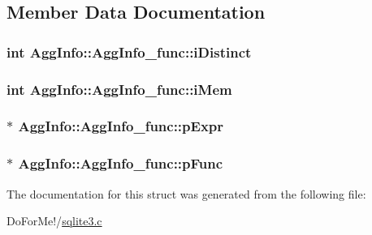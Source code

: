 \subsection{Member Data Documentation}
\hypertarget{struct_agg_info_1_1_agg_info__func_a4a82635b0116eb44ec8ca9e47cc509d9}{
\subsubsection[{i\-Distinct}]{\setlength{\rightskip}{0pt plus 5cm}int Agg\-Info\-::\-Agg\-Info\-\_\-func\-::i\-Distinct}}\label{struct_agg_info_1_1_agg_info__func_a4a82635b0116eb44ec8ca9e47cc509d9}
\hypertarget{struct_agg_info_1_1_agg_info__func_a41a8da36555c37fffc65f1acead49a4f}{
\subsubsection[{i\-Mem}]{\setlength{\rightskip}{0pt plus 5cm}int Agg\-Info\-::\-Agg\-Info\-\_\-func\-::i\-Mem}}\label{struct_agg_info_1_1_agg_info__func_a41a8da36555c37fffc65f1acead49a4f}
\hypertarget{struct_agg_info_1_1_agg_info__func_a7b92e1c42e60d44e28ebf695316f4018}{
\subsubsection[{p\-Expr}]{$\ast$ Agg\-Info\-::\-Agg\-Info\-\_\-func\-::p\-Expr}}\label{struct_agg_info_1_1_agg_info__func_a7b92e1c42e60d44e28ebf695316f4018}
\hypertarget{struct_agg_info_1_1_agg_info__func_a840478e8ec53cefa57b50228f6fdafe4}{
\subsubsection[{p\-Func}]{$\ast$ Agg\-Info\-::\-Agg\-Info\-\_\-func\-::p\-Func}}\label{struct_agg_info_1_1_agg_info__func_a840478e8ec53cefa57b50228f6fdafe4}


The documentation for this struct was generated from the following file\-:\begin{DoxyCompactItemize}
\item 
Do\-For\-Me!/\hyperlink{sqlite3_8c}{sqlite3.\-c}\end{DoxyCompactItemize}
